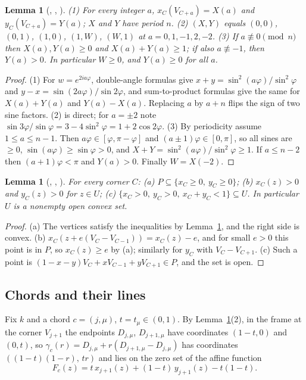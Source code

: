 \documentclass[11pt]{amsart}
\theoremstyle{plain}
\newtheorem{lemma}[theorem]{Lemma}
\theoremstyle{definition}
\begin{document}
\begin{lemma}[, , ]\label{lem:frame}
(1) For every integer $a$, $x_C(V_{C+a})=X(a)$ and $y_C(V_{C+a})=Y(a)$; $X$ and $Y$ have period $n$.
(2) $(X,Y)$ equals $(0,0)$, $(0,1)$, $(1,0)$, $(1,W)$, $(W,1)$ at $a=0,1,-1,2,-2$.
(3) If $a\not\equiv0\pmod n$ then $X(a),Y(a)\ge0$ and $X(a)+Y(a)\ge1$; if also $a\not\equiv-1$, then $Y(a)>0$. In particular $W\ge0$, and $Y(a)\ge0$ for all $a$.
\end{lemma}

\begin{proof}
(1) For $w=e^{2ia\varphi}$, double-angle formulas give $x+y=\sin^2(a\varphi)/\sin^2\varphi$ and $y-x=\sin(2a\varphi)/\sin2\varphi$, and sum-to-product formulas give the same for $X(a)+Y(a)$ and $Y(a)-X(a)$. Replacing $a$ by $a+n$ flips the sign of two sine factors. (2) is direct; for $a=\pm2$ note $\sin3\varphi/\sin\varphi=3-4\sin^2\varphi=1+2\cos2\varphi$. (3) By periodicity assume $1\le a\le n-1$. Then $a\varphi\in[\varphi,\pi-\varphi]$ and $(a\pm1)\varphi\in[0,\pi]$, so all sines are $\ge0$, $\sin(a\varphi)\ge\sin\varphi>0$, and $X+Y=\sin^2(a\varphi)/\sin^2\varphi\ge1$. If $a\le n-2$ then $(a+1)\varphi<\pi$ and $Y(a)>0$. Finally $W=X(-2)$.
\end{proof}

\begin{lemma}[, , ]\label{lem:polygon}
For every corner $C$: (a) $P\subseteq\{x_C\ge0,\ y_C\ge0\}$; (b) $x_C(z)>0$ and $y_C(z)>0$ for $z\in U$; (c) $\{x_C>0,\ y_C>0,\ x_C+y_C<1\}\subseteq U$. In particular $U$ is a nonempty open convex set.
\end{lemma}

\begin{proof}
(a) The vertices satisfy the inequalities by Lemma~\ref{lem:frame}, and the right side is convex. (b) $x_C(z+e(V_C-V_{C-1}))=x_C(z)-e$, and for small $e>0$ this point is in $P$, so $x_C(z)\ge e$ by (a); similarly for $y_C$ with $V_C-V_{C+1}$. (c) Such a point is $(1-x-y)V_C+xV_{C-1}+yV_{C+1}\in P$, and the set is open.
\end{proof}

\subsection{Chords and their lines}
Fix $k$ and a chord $c=(j,\mu)$, $t=t_\mu\in(0,1)$. By Lemma~\ref{lem:frame}(2), in the frame at the corner $V_{j+1}$ the endpoints $D_{j,\mu}$, $D_{j+1,\mu}$ have coordinates $(1-t,0)$ and $(0,t)$, so $\gamma_c(r)=D_{j,\mu}+r(D_{j+1,\mu}-D_{j,\mu})$ has coordinates $((1-t)(1-r),\,tr)$ and lies on the zero set of the affine function
\[
F_c(z)=t\,x_{j+1}(z)+(1-t)\,y_{j+1}(z)-t(1-t).
\]
\end{document}
